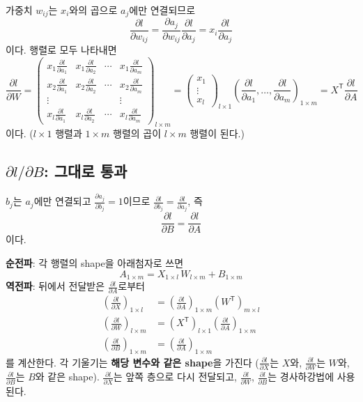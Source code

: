 \documentclass[11pt,a4paper]{article}
\newcommand{\T}{^{\mathsf T}}
\newcommand{\pd}[2]{\frac{\partial #1}{\partial #2}}
\begin{document}
가중치 $w_{ij}$는 $x_i$와의 곱으로 $a_j$에만 연결되므로
\[
\pd{l}{w_{ij}}=\pd{a_j}{w_{ij}}\pd{l}{a_j}=x_i\pd{l}{a_j}
\]
이다. 행렬로 모두 나타내면
\[
\pd{l}{W}
=
\begin{pmatrix}
x_1\pd{l}{a_1}&x_1\pd{l}{a_2}&\cdots&x_1\pd{l}{a_m}\\[4pt]
x_2\pd{l}{a_1}&x_2\pd{l}{a_2}&\cdots&x_2\pd{l}{a_m}\\
\vdots&&&\vdots\\
x_l\pd{l}{a_1}&x_l\pd{l}{a_2}&\cdots&x_l\pd{l}{a_m}
\end{pmatrix}_{l\times m}
=
\begin{pmatrix}x_1\\ \vdots\\ x_l\end{pmatrix}_{l\times1}
\left(\pd{l}{a_1},\ldots,\pd{l}{a_m}\right)_{1\times m}
=X\T\pd{l}{A}
\]
이다. ($l\times1$ 행렬과 $1\times m$ 행렬의 곱이 $l\times m$ 행렬이 된다.)

\subsection{$\partial l/\partial B$: 그대로 통과}

$b_j$는 $a_j$에만 연결되고 $\pd{a_j}{b_j}=1$이므로
$\pd{l}{b_j}=\pd{l}{a_j}$, 즉
\[
\pd{l}{B}=\pd{l}{A}
\]
이다.

\begin{keybox}
\textbf{순전파}: 각 행렬의 shape을 아래첨자로 쓰면
\[
\boxed{
A_{1\times m}=X_{1\times l}\,W_{l\times m}+B_{1\times m}
}
\]
\textbf{역전파}: 뒤에서 전달받은 $\pd{l}{A}$로부터
\[
\boxed{
\begin{aligned}
\left(\pd{l}{X}\right)_{1\times l}&=\left(\pd{l}{A}\right)_{1\times m}\left(W\T\right)_{m\times l}\\[4pt]
\left(\pd{l}{W}\right)_{l\times m}&=\left(X\T\right)_{l\times 1}\left(\pd{l}{A}\right)_{1\times m}\\[4pt]
\left(\pd{l}{B}\right)_{1\times m}&=\left(\pd{l}{A}\right)_{1\times m}
\end{aligned}
}
\]
를 계산한다. 각 기울기는 \textbf{해당 변수와 같은 shape}을 가진다
($\pd{l}{X}$는 $X$와, $\pd{l}{W}$는 $W$와, $\pd{l}{B}$는 $B$와 같은 shape).
$\pd{l}{X}$는 앞쪽 층으로 다시 전달되고, $\pd{l}{W}$, $\pd{l}{B}$는 경사하강법에 사용된다.
\end{keybox}
\end{document}
